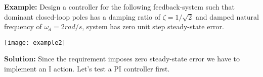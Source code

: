 \documentclass[twoside]{article}
\begin{document}
\vspace{3 pt}

\vspace{12 pt}

\textbf{Example:} Design a controller for the following
feedback-system such that dominant closed-loop poles
has a damping ratio of $\zeta = 1/\sqrt{2}$ and damped natural
frequency of $\omega_d = 2 rad/s$, system has zero
unit step steady-state error. 

\vspace{6 pt}

  \begin{minipage}[h]{1\linewidth}
    \begin{center}
      \texttt{[image: example2]}
    \end{center}
  \end{minipage}

\vspace{6 pt}

\textbf{Solution:} Since the requirement imposes zero steady-state
error we have to implement an I action. Let's test a PI controller 
first. 
\end{document}
